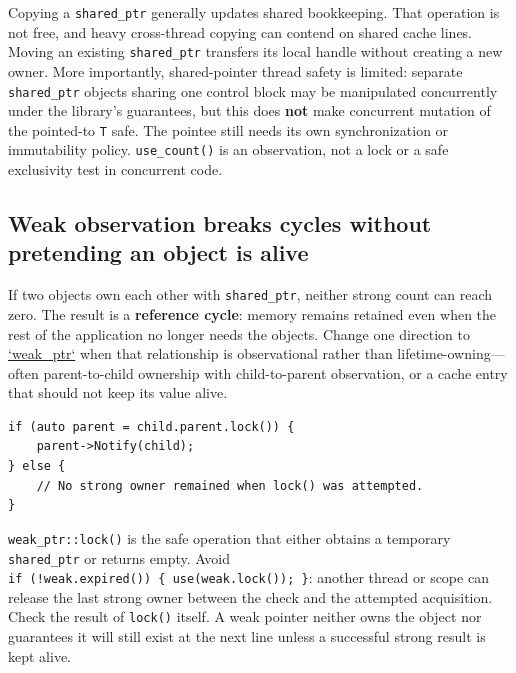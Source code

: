 Copying a \texttt{shared\_ptr} generally updates shared bookkeeping. That operation is not free, and heavy cross-thread copying can contend on shared cache lines. Moving an existing \texttt{shared\_ptr} transfers its local handle without creating a new owner. More importantly, shared-pointer thread safety is limited: separate \texttt{shared\_ptr} objects sharing one control block may be manipulated concurrently under the library's guarantees, but this does \textbf{not} make concurrent mutation of the pointed-to \texttt{T} safe. The pointee still needs its own synchronization or immutability policy. \texttt{use\_count()} is an observation, not a lock or a safe exclusivity test in concurrent code.

\subsection{Weak observation breaks cycles without pretending an object is alive}\label{05-engine-i-ch004-weak-observation-breaks-cycles-without-pretending-an-object-is-alive}

\hypertarget{05-engine-i-ch004-weak-observation-breaks-cycles-without-pretending-an-object-is-alive}{}

If two objects own each other with \texttt{shared\_ptr}, neither strong count can reach zero. The result is a \textbf{reference cycle}: memory remains retained even when the rest of the application no longer needs the objects. Change one direction to \hyperref[appendix-b9548675eb2b]{`weak\_ptr`} when that relationship is observational rather than lifetime-owning---often parent-to-child ownership with child-to-parent observation, or a cache entry that should not keep its value alive.

\begin{verbatim}
if (auto parent = child.parent.lock()) {
    parent->Notify(child);
} else {
    // No strong owner remained when lock() was attempted.
}
\end{verbatim}

\texttt{weak\_ptr::lock()} is the safe operation that either obtains a temporary \texttt{shared\_ptr} or returns empty. Avoid \texttt{if\ (!weak.expired())\ \{\ use(weak.lock());\ \}}: another thread or scope can release the last strong owner between the check and the attempted acquisition. Check the result of \texttt{lock()} itself. A weak pointer neither owns the object nor guarantees it will still exist at the next line unless a successful strong result is kept alive.

